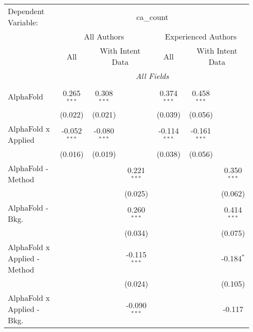 \begingroup
\centering
\begin{tabular}{lcccccc}
   \tabularnewline \midrule \midrule
   Dependent Variable: & \multicolumn{6}{c}{ca\_count}\\
 & \multicolumn{3}{c}{All Authors} & \multicolumn{3}{c}{Experienced Authors} \\
\cmidrule(lr){2-4} \cmidrule(lr){5-7}
 & \multicolumn{1}{c}{All} & \multicolumn{2}{c}{With Intent Data} & \multicolumn{1}{c}{All} & \multicolumn{2}{c}{With Intent Data} \\
\cmidrule(lr){2-2} \cmidrule(lr){3-4} \cmidrule(lr){5-5} \cmidrule(lr){6-7}
 & \multicolumn{6}{c}{\textit{All Fields}} \\ \\
   AlphaFold                      & 0.265$^{***}$  & 0.308$^{***}$  &                & 0.374$^{***}$  & 0.458$^{***}$  &   \\   
                                  & (0.022)        & (0.021)        &                & (0.039)        & (0.056)        &   \\   
   AlphaFold x Applied            & -0.052$^{***}$ & -0.080$^{***}$ &                & -0.114$^{***}$ & -0.161$^{***}$ &   \\   
                                  & (0.016)        & (0.019)        &                & (0.038)        & (0.056)        &   \\   
   AlphaFold - Method             &                &                & 0.221$^{***}$  &                &                & 0.350$^{***}$\\   
                                  &                &                & (0.025)        &                &                & (0.062)\\   
   AlphaFold - Bkg.               &                &                & 0.260$^{***}$  &                &                & 0.414$^{***}$\\   
                                  &                &                & (0.034)        &                &                & (0.075)\\   
   AlphaFold x Applied - Method   &                &                & -0.115$^{***}$ &                &                & -0.184$^{*}$\\   
                                  &                &                & (0.024)        &                &                & (0.105)\\   
   AlphaFold x Applied - Bkg.     &                &                & -0.090$^{***}$ &                &                & -0.117\\   

\end{tabular}
